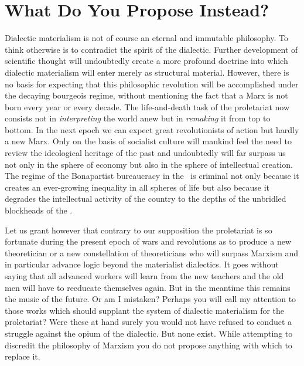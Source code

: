 \section*{What Do You Propose Instead?}

Dialectic materialism is not of course an eternal and immutable philosophy. To think otherwise is to contradict the spirit of the dialectic. Further development of scientific thought will undoubtedly create a more profound doctrine into which dialectic materialism will enter merely as structural material. However, there is no basis for expecting that this philosophic revolution will be accomplished under the decaying bourgeois regime, without mentioning the fact that a Marx is not born every year or every decade. The life-and-death task of the proletariat now consists not in \emph{interpreting} the world anew but in \emph{remaking} it from top to bottom. In the next epoch we can expect great revolutionists of action but hardly a new Marx. Only on the basis of socialist culture will mankind feel the need to review the ideological heritage of the past and undoubtedly will far surpass us not only in the sphere of economy but also in the sphere of intellectual creation. The regime of the Bonapartist bureaucracy in the \USSR\ is criminal not only because it creates an ever-growing inequality in all spheres of life but also because it degrades the intellectual activity of the country to the depths of the unbridled blockheads of the \GPU.

Let us grant however that contrary to our supposition the proletariat is so fortunate during the present epoch of wars and revolutions as to produce a new theoretician or a new constellation of theoreticians who will surpass Marxism and in particular advance logic beyond the materialist dialectics. It goes without saying that all advanced workers will learn from the new teachers and the old men will have to reeducate themselves again. But in the meantime this remains the music of the future. Or am I mistaken? Perhaps you will call my attention to those works which should supplant the system of dialectic materialism for the proletariat? Were these at hand surely you would not have refused to conduct a struggle against the opium of the dialectic. But none exist. While attempting to discredit the philosophy of Marxism you do not propose anything with which to replace it.

